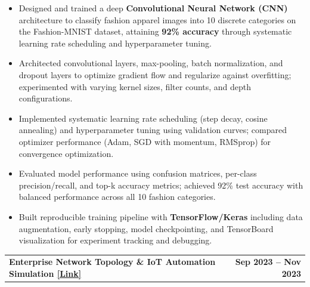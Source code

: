 \documentclass[10pt,a4paper]{article}
\makeatletter
\newcommand{\entry}[2]{%
    \noindent
    \begin{tabularx}{\linewidth}{@{}X r@{}}
        \textbf{#1} & \textbf{#2}
    \end{tabularx}
    \vspace{-2pt}
}
\makeatother
\begin{document}
\begin{itemize}

\item Designed and trained a deep \textbf{Convolutional Neural Network (CNN)} architecture to classify fashion apparel images into 10 discrete categories on the Fashion-MNIST dataset, attaining \textbf{92\% accuracy} through systematic learning rate scheduling and hyperparameter tuning.

\item Architected convolutional layers, max-pooling, batch normalization, and dropout layers to optimize gradient flow and regularize against overfitting; experimented with varying kernel sizes, filter counts, and depth configurations.

\item Implemented systematic learning rate scheduling (step decay, cosine annealing) and hyperparameter tuning using validation curves; compared optimizer performance (Adam, SGD with momentum, RMSprop) for convergence optimization.

\item Evaluated model performance using confusion matrices, per-class precision/recall, and top-k accuracy metrics; achieved 92\% test accuracy with balanced performance across all 10 fashion categories.

\item Built reproducible training pipeline with \textbf{TensorFlow/Keras} including data augmentation, early stopping, model checkpointing, and TensorBoard visualization for experiment tracking and debugging.

\end{itemize}

\vspace{1pt}

\entry
{Enterprise Network Topology \& IoT Automation Simulation
\hspace{2pt}
\href{https://github.com/marideharshith21}
{\textcolor{linkblue}{[Link]}}}
{Sep 2023 -- Nov 2023}
\end{document}
